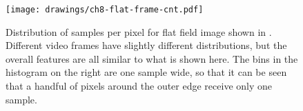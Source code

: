 \begin{figure}
\centering
\texttt{[image: drawings/ch8-flat-frame-cnt.pdf]}
\caption{
  Distribution of samples per pixel for flat field image shown in .
  Different video frames have slightly different distributions, but the overall features are all similar to what is shown here.
  The bins in the histogram on the right are one sample wide, so that it can be seen that a handful of pixels around the outer edge receive only one sample.
}
\label{fig:ch8-flat-frame-cnt}
\end{figure}




